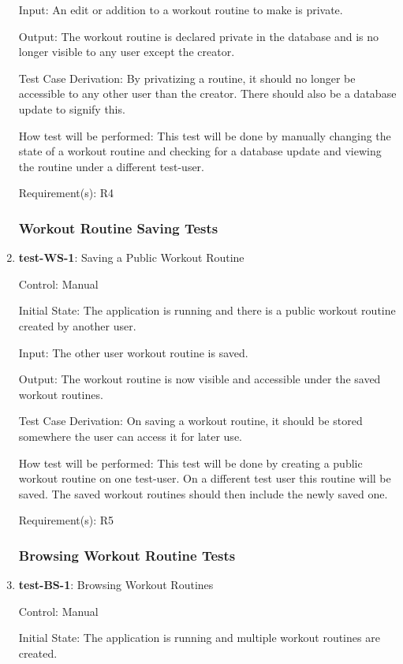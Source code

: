 \documentclass[12pt, titlepage]{article}
\begin{document}
\begin{enumerate}
		Input: An edit or addition to a workout routine to make is private.
		
		Output: The workout routine is declared private in the database and is no longer visible to any user except the creator.
		
		Test Case Derivation: By privatizing a routine, it should no longer be accessible to any other user than the creator. There should also be a database update to signify this.
		
		How test will be performed: This test will be done by manually changing the state of a workout routine and checking for a database update and viewing the routine under a different test-user.
		
		Requirement(s): R4
		
		\subsubsection{Workout Routine Saving Tests}
	
		\item{\textbf{test-WS-1}}: Saving a Public Workout Routine
		
		Control: Manual
		
		Initial State: The application is running and there is a public workout routine created by another user.
		
		Input: The other user workout routine is saved.
		
		Output: The workout routine is now visible and accessible under the saved workout routines.
		
		Test Case Derivation: On saving a workout routine, it should be stored somewhere the user can access it for later use.
		
		How test will be performed: This test will be done by creating a public workout routine on one test-user. On a different test user this routine will be saved. The saved workout routines should then include the newly saved one.
		
		Requirement(s): R5
		
		\subsubsection{Browsing Workout Routine Tests}
		\item{\textbf{test-BS-1}}: Browsing Workout Routines
		
		Control: Manual
		
		Initial State: The application is running and multiple workout routines are created.
		

\end{enumerate}
\end{document}
